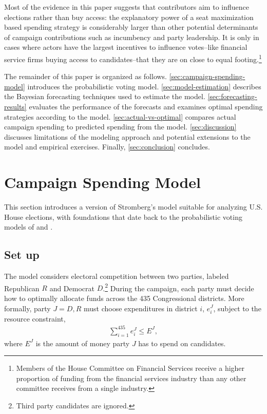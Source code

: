 \documentclass[12pt,final,fleqn]{article}
\theoremstyle{plain}
\begin{document}
Most of the evidence in this paper suggests that contributors aim to influence elections rather than buy access: the explanatory power of a seat maximization based spending strategy is considerably larger than other potential determinants of campaign contributions such as incumbency and party leadership. It is only in cases where actors have the largest incentives to influence votes--like financial service firms buying access to candidates--that they are on close to equal footing.\footnote{Members of the House Committee on Financial Services receive a higher proportion of funding from the financial services industry than any other committee receives from a single industry.}

The remainder of this paper is organized as follows. \autoref{sec:campaign-spending-model} introduces the probabilistic voting model. \autoref{sec:model-estimation} describes the Bayesian forecasting techniques used to estimate the model. \autoref{sec:forecasting-results} evaluates the performance of the forecasts and examines optimal spending strategies according to the model. \autoref{sec:actual-vs-optimal} compares actual campaign spending to predicted spending from the model. \autoref{sec:discussion} discusses limitations of the modeling approach and potential extensions to the model and empirical exercises. Finally, \autoref{sec:conclusion} concludes. 

\section{Campaign Spending Model} \label{sec:campaign-spending-model}
This section introduces a version of Stromberg's \citeyear{stromberg2008electoral} model suitable for analyzing U.S. House elections, with foundations that date back to the probabilistic voting models of \citet{lindbeck1987balanced} and \citet{dixit1996determinants}. 

\subsection{Set up}
The model considers electoral competition between two parties, labeled Republican $R$ and Democrat $D$.\footnote{Third party candidates are ignored.} During the campaign, each party must decide how to optimally allocate funds across the 435 Congressional districts. More formally, party $J = D, R$ must choose expenditures in district $i$, $e^J_i$, subject to the resource constraint, 
\begin{align} \label{eqn: budget constraint}
\sum_{i=1}^{435} e^J_i \leq E^J,
\end{align}
where $E^J$ is the amount of money party $J$ has to spend on candidates.
\end{document}
